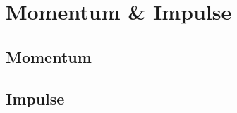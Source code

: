 \documentclass[../alevelmaths.tex]{subfiles}
\begin{document}
\chapter{Momentum \& Impulse}
\section{Momentum}
\section{Impulse}
\end{document}
